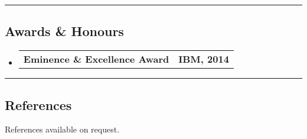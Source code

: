 \documentclass[10pt,letterpaper]{article}
\makeatletter
\newcommand{\headerrow}[2]
{\begin{tabular*}{\linewidth}{l@{\extracolsep{\fill}}r}
    #1 &
    #2 \\
\end{tabular*}}
\makeatother
\begin{document}
\hrule
\vspace{-0.4em}
\subsection*{Awards \& Honours}

\begin{itemize}
    \parskip=0.1em
    \item
    \headerrow
        {\textbf{Eminence \& Excellence Award}}
        {\textbf{IBM, 2014}}

\end{itemize}

\hrule
\vspace{-0.4em}
\subsection*{References}

References available on request.
\end{document}
